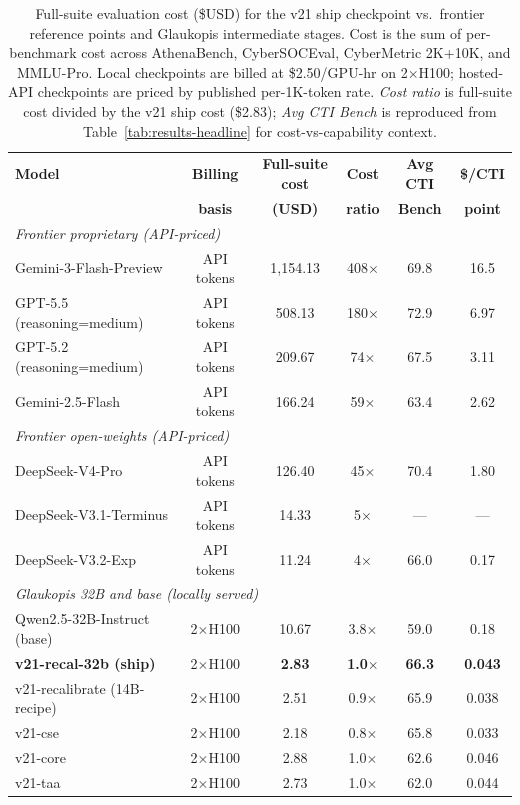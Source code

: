 \documentclass[conference]{IEEEtran}
\begin{document}
\begin{table}[t]
\centering
\caption{Full-suite evaluation cost (\$USD) for the v21 ship checkpoint vs.\ frontier reference points and Glaukopis intermediate stages. Cost is the sum of per-benchmark cost across AthenaBench, CyberSOCEval, CyberMetric 2K+10K, and MMLU-Pro. Local checkpoints are billed at \$2.50/GPU-hr on 2$\times$H100; hosted-API checkpoints are priced by published per-1K-token rate. \emph{Cost ratio} is full-suite cost divided by the v21 ship cost (\$2.83); \emph{Avg CTI Bench} is reproduced from Table~\ref{tab:results-headline} for cost-vs-capability context.}
\label{tab:results-cost}
\small
\setlength{\tabcolsep}{4pt}
\begin{tabular}{lccccc}
\hline
\textbf{Model} & \textbf{Billing} & \textbf{Full-suite cost} & \textbf{Cost} & \textbf{Avg CTI} & \textbf{\$/CTI} \\
               & \textbf{basis}   & \textbf{(USD)}            & \textbf{ratio} & \textbf{Bench} & \textbf{point} \\
\hline
\multicolumn{6}{l}{\textit{Frontier proprietary (API-priced)}} \\
Gemini-3-Flash-Preview            & API tokens & 1{,}154.13 & 408$\times$ & 69.8 & 16.5 \\
GPT-5.5 (reasoning=medium)        & API tokens &    508.13 & 180$\times$ & 72.9 &  6.97 \\
GPT-5.2 (reasoning=medium)        & API tokens &    209.67 &  74$\times$ & 67.5 &  3.11 \\
Gemini-2.5-Flash                  & API tokens &    166.24 &  59$\times$ & 63.4 &  2.62 \\
\multicolumn{6}{l}{\textit{Frontier open-weights (API-priced)}} \\
DeepSeek-V4-Pro                   & API tokens &    126.40 &  45$\times$ & 70.4 &  1.80 \\
DeepSeek-V3.1-Terminus            & API tokens &     14.33 &   5$\times$ & --- & --- \\
DeepSeek-V3.2-Exp                 & API tokens &     11.24 &   4$\times$ & 66.0 &  0.17 \\
\multicolumn{6}{l}{\textit{Glaukopis 32B and base (locally served)}} \\
Qwen2.5-32B-Instruct (base)       & 2$\times$H100 &    10.67 & 3.8$\times$ & 59.0 & 0.18 \\
\textbf{v21-recal-32b (ship)}     & 2$\times$H100 & \textbf{2.83} & \textbf{1.0$\times$} & \textbf{66.3} & \textbf{0.043} \\
v21-recalibrate (14B-recipe)      & 2$\times$H100 &     2.51 & 0.9$\times$ & 65.9 & 0.038 \\
v21-cse                           & 2$\times$H100 &     2.18 & 0.8$\times$ & 65.8 & 0.033 \\
v21-core                          & 2$\times$H100 &     2.88 & 1.0$\times$ & 62.6 & 0.046 \\
v21-taa                           & 2$\times$H100 &     2.73 & 1.0$\times$ & 62.0 & 0.044 \\
\hline
\end{tabular}
\end{table}
\end{document}
